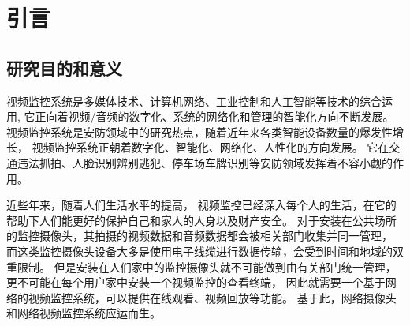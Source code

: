 \chapter{引言}
\section{研究目的和意义}
视频监控系统是多媒体技术、计算机网络、工业控制和人工智能等技术的综合运用,
它正向着视频/音频的数字化、系统的网络化和管理的智能化方向不断发展\cite{宋磊2003视频监控系统概述}。
视频监控系统是安防领域中的研究热点，随着近年来各类智能设备数量的爆发性增长，
视频监控系统正朝着数字化、智能化、网络化、人性化的方向发展。
它在交通违法抓拍、人脸识别辨别逃犯、停车场车牌识别等安防领域发挥着不容小觑的作用。

近些年来，随着人们生活水平的提高，
视频监控已经深入每个人的生活，在它的帮助下人们能更好的保护自己和家人的人身以及财产安全。
对于安装在公共场所的监控摄像头，其拍摄的视频数据和音频数据都会被相关部门收集并同一管理，
而这类监控摄像头设备大多是使用电子线缆进行数据传输，会受到时间和地域的双重限制。
但是安装在人们家中的监控摄像头就不可能做到由有关部门统一管理，
更不可能在每个用户家中安装一个视频监控的查看终端，
因此就需要一个基于网络的视频监控系统，可以提供在线观看、视频回放等功能。
基于此，网络摄像头和网络视频监控系统应运而生。




